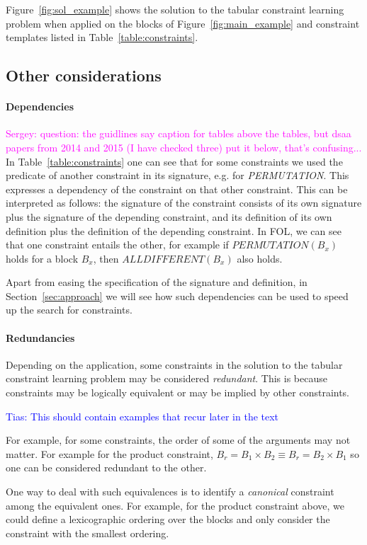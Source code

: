 \documentclass{IEEEtran}
\newcommand{\sergey}[1]{\textcolor{magenta}{{\sc Sergey:} #1}\xspace}
\newcommand{\tias}[1]{\textcolor{blue}{{\sc Tias:} #1}\xspace}
\newcommand{\eccalc}[2]{\ensuremath{#1 = #2}}
\newcommand{\ecalldiff}[1]{\ensuremath{\textit{ALLDIFFERENT}(#1)}}
\newcommand{\ecperm}[1]{\ensuremath{\textit{PERMUTATION}(#1)}}
\newcommand{\ecprod}[3]{\eccalc{#1}{#2 \times #3}}
\newcommand{\sg}{B}
\theoremstyle{definition}
\begin{document}
Figure~\ref{fig:sol_example} shows the solution to the tabular constraint learning problem when applied on the blocks of Figure~\ref{fig:main_example} and constraint templates listed in Table~\ref{table:constraints}.

\subsection{Other considerations}

\paragraph{Dependencies}
\sergey{question: the guidlines say caption for tables above the tables, but dsaa papers from 2014 and 2015 (I have checked three) put it below, that's confusing...}
In Table~\ref{table:constraints} one can see that for some constraints we used the predicate of another constraint in its signature, e.g. for \textit{PERMUTATION}. This expresses a dependency of the constraint on that other constraint. This can be interpreted as follows: the signature of the constraint consists of its own signature plus the signature of the depending constraint, and its definition of its own definition plus the definition of the depending constraint.
In FOL, we can see that one constraint entails the other, for example if $\ecperm{\sg_x}$ holds for a block $\sg_x$, then $\ecalldiff{\sg_{x}}$ also holds.

Apart from easing the specification of the signature and definition, in Section~\ref{sec:approach} we will see how such dependencies can be used to speed up the search for constraints.

\paragraph{Redundancies}
Depending on the application, some constraints in the solution to the tabular constraint learning problem may be considered \textit{redundant}. This is because constraints may be logically equivalent or may be implied by other constraints.

\tias{This should contain examples that recur later in the text}

For example, for some constraints, the order of some of the arguments may not matter. For example for the product constraint, $\ecprod{\sg_r}{\sg_1}{\sg_2} \equiv \ecprod{\sg_r}{\sg_2}{\sg_1}$ so one can be considered redundant to the other.

One way to deal with such equivalences is to identify a \textit{canonical} constraint among the equivalent ones. For example, for the product constraint above, we could define a lexicographic ordering over the blocks and only consider the constraint with the smallest ordering.
\end{document}
